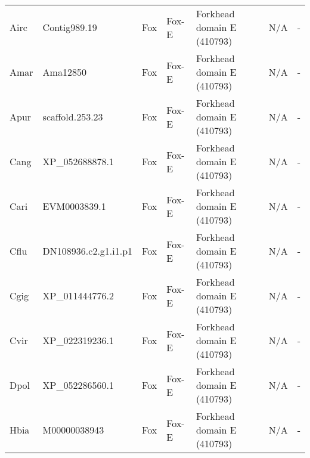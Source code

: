 \documentclass[../main.tex]{subfiles}
\begin{document}
\begin{landscape}
\begin{longtable}{lllllll}
		Airc           & Contig989.19          & Fox            & Fox-E               & Forkhead domain E (410793)                  & N/A                                                                    & -                    \\
		Amar           & Ama12850              & Fox            & Fox-E               & Forkhead domain E (410793)                  & N/A                                                                    & -                    \\
		Apur           & scaffold.253.23       & Fox            & Fox-E               & Forkhead domain E (410793)                  & N/A                                                                    & -                    \\
		Cang           & XP\_052688878.1       & Fox            & Fox-E               & Forkhead domain E (410793)                  & N/A                                                                    & -                    \\
		Cari           & EVM0003839.1          & Fox            & Fox-E               & Forkhead domain E (410793)                  & N/A                                                                    & -                    \\
		Cflu           & DN108936.c2.g1.i1.p1  & Fox            & Fox-E               & Forkhead domain E (410793)                  & N/A                                                                    & -                    \\
		Cgig           & XP\_011444776.2       & Fox            & Fox-E               & Forkhead domain E (410793)                  & N/A                                                                    & -                    \\
		Cvir           & XP\_022319236.1       & Fox            & Fox-E               & Forkhead domain E (410793)                  & N/A                                                                    & -                    \\
		Dpol           & XP\_052286560.1       & Fox            & Fox-E               & Forkhead domain E (410793)                  & N/A                                                                    & -                    \\
		Hbia           & M00000038943          & Fox            & Fox-E               & Forkhead domain E (410793)                  & N/A                                                                    & -                    \\

\end{longtable}
\end{landscape}
\end{document}
